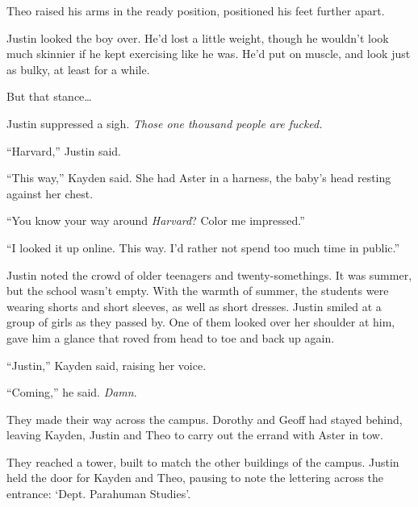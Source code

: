 Theo raised his arms in the ready position, positioned his feet further apart.



Justin looked the boy over.  He'd lost a little weight, though he wouldn't look much skinnier if he kept exercising like he was.  He'd put on muscle, and look just as bulky, at least for a while.



But that stance\ldots



Justin suppressed a sigh.  \emph{Those one thousand people are fucked.}



\sectionbreak



``Harvard,'' Justin said.



``This way,'' Kayden said.  She had Aster in a harness, the baby's head resting against her chest.



``You know your way around \emph{Harvard}?  Color me impressed.''



``I looked it up online.  This way.  I'd rather not spend too much time in public.''



Justin noted the crowd of older teenagers and twenty-somethings.  It was summer, but the school wasn't empty.  With the warmth of summer, the students were wearing shorts and short sleeves, as well as short dresses.  Justin smiled at a group of girls as they passed by.  One of them looked over her shoulder at him, gave him a glance that roved from head to toe and back up again.



``Justin,'' Kayden said, raising her voice.



``Coming,'' he said.  \emph{Damn}.



They made their way across the campus.  Dorothy and Geoff had stayed behind, leaving Kayden, Justin and Theo to carry out the errand with Aster in tow.



They reached a tower, built to match the other buildings of the campus.  Justin held the door for Kayden and Theo, pausing to note the lettering across the entrance: `Dept. Parahuman Studies'.



